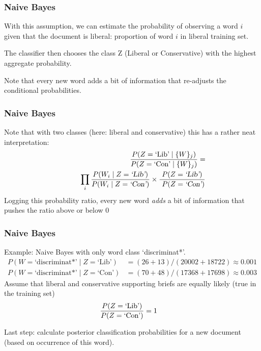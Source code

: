 \documentclass{hertieteaching}
\begin{document}
\begin{frame}[t,fragile]\frametitle{Naive Bayes}

With this assumption, we can estimate the probability of observing a word $i$  given that the document is liberal: proportion of word $i$ in liberal training set.

The classifier then chooses the class Z (Liberal or Conservative) with the highest aggregate probability.

Note that every new word adds a bit of information that re-adjusts the conditional probabilities.

\newpage


\end{frame}
\begin{frame}[t,fragile]\frametitle{Naive Bayes}



Note that with two classes (here: liberal and conservative)  this has a rather neat interpretation:
\begin{align*}
\frac{P(Z=\text{\text{`Lib'}} \mid \{W\}_j)}
{P(Z=\text{`Con'} \mid \{W\}_j)} = \\
~~~~~~~~~\prod_i \frac{P(W_i \mid Z=\textsl{\text{`Lib'}})}
{P(W_i \mid Z=\textsl{`Con'})}\times \frac{P(Z=\textsl{\text{`Lib'}})}{~P(Z=\textsl{`Con'})}
\end{align*}
Logging this probability ratio, every new word \textsl{adds} a bit of information that pushes the ratio above or below 0





\end{frame}
\begin{frame}[t,fragile]\frametitle{Naive Bayes}

Example: Naive Bayes with only word class `discriminat*'.
{\small
\begin{align*}
P(W=\text{`discriminat*'} \mid Z=\text{`Lib'}) & = (26+13)/(20002+18722) \approx 0.001\\
P(W=\text{`discriminat*'} \mid Z=\text{`Con'}) & = (70+48)/(17368+17698) \approx 0.003
\end{align*}
}
Assume that liberal and conservative supporting briefs are equally likely (true in the training set)
\begin{align*}
\frac{P(Z=\text{\text{`Lib'}})}{P(Z=\text{`Con'})} & = 1
\end{align*}

Last step:  calculate posterior classification  probabilities for a new document (based on occurrence of this word).

\end{frame}
\end{document}
